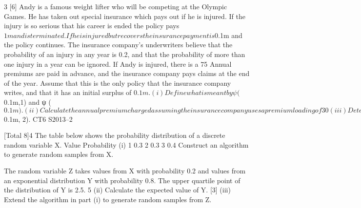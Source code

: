 3
[6]
Andy is a famous weight lifter who will be competing at the Olympic Games. He has
taken out special insurance which pays out if he is injured. If the injury is so serious
that his career is ended the policy pays $1m and is terminated. If he is injured but
recovers the insurance payment is $0.1m and the policy continues.
The insurance company’s underwriters believe that the probability of an injury in any
year is 0.2, and that the probability of more than one injury in a year can be ignored.
If Andy is injured, there is a 75%
Annual premiums are paid in advance, and the insurance company pays claims at the
end of the year. Assume that this is the only policy that the insurance company
writes, and that it has an initial surplus of $0.1m.
(i) Define what is meant by ψ ($0.1m,1) and ψ ($0.1m).
(ii) Calculate the annual premium charged assuming the insurance company uses a
premium loading of 30%

(iii) Determine ψ ($0.1m, 2).
CT6 S2013–2


[Total 8]4
The table below shows the probability distribution of a discrete random variable X.
Value
Probability
(i)
1
0.3
2
0.3
3
0.4
Construct an algorithm to generate random samples from X.

The random variable Z takes values from X with probability 0.2 and values from an
exponential distribution Y with probability 0.8. The upper quartile point of the
distribution of Y is 2.5.
5
(ii) Calculate the expected value of Y.
[3]
(iii) Extend the algorithm in part (i) to generate random samples from Z.


